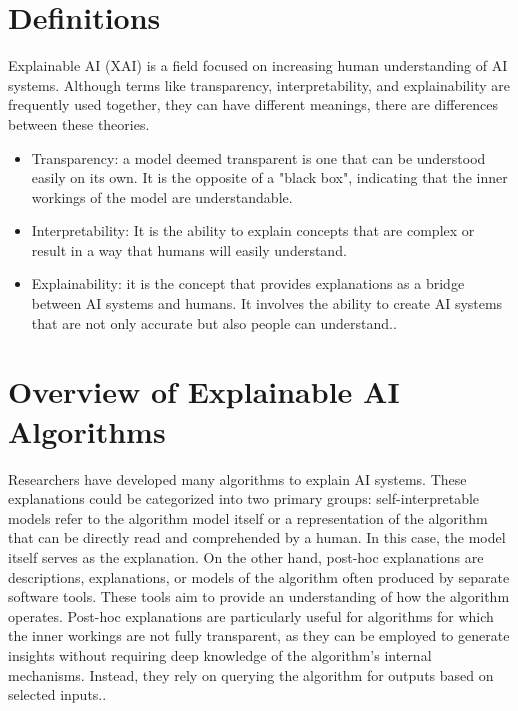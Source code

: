 \documentclass[10pt,journal,compsoc]{IEEEtran}
\begin{document}
\section{Definitions}

Explainable AI (XAI) is a field focused on increasing human understanding of AI systems. Although terms like transparency, interpretability, and explainability are frequently used together, they can have different meanings, there are differences between these theories.\cite{xai-ml}

\begin{itemize}
    \item {Transparency}: a model deemed transparent is one that can be understood easily on its own. It is the opposite of a "black box", indicating that the inner workings of the model are understandable\cite{transparency}.
    \item {Interpretability}: It is the ability to explain concepts that are complex or result in a way that humans will easily understand\cite{gilpin2019explaining}.
    \item {Explainability}: it is the concept that provides explanations as a bridge between AI systems and humans. It involves the ability to create AI systems that are not only accurate but also people can understand.\cite{gilpin2019explaining}.
\end{itemize}

\section{Overview of Explainable AI Algorithms}
Researchers have developed many algorithms to explain AI systems. These explanations could be categorized into two primary groups: self-interpretable models refer to the algorithm model itself or a representation of the algorithm that can be directly read and comprehended by a human. In this case, the model itself serves as the explanation. On the other hand, post-hoc explanations are descriptions, explanations, or models of the algorithm often produced by separate software tools. These tools aim to provide an understanding of how the algorithm operates. Post-hoc explanations are particularly useful for algorithms for which the inner workings are not fully transparent, as they can be employed to generate insights without requiring deep knowledge of the algorithm's internal mechanisms. Instead, they rely on querying the algorithm for outputs based on selected inputs.\cite{phillips2020four}.
\end{document}
